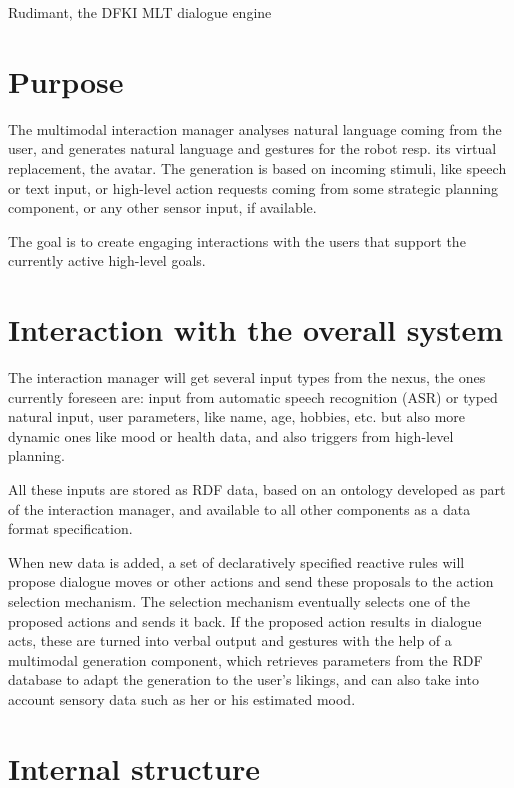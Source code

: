 \documentclass[a4paper]{article}
\begin{document}
\begin{center}
  \Large Rudimant, the DFKI MLT dialogue engine
\end{center}

\section{Purpose}

The multimodal interaction manager analyses natural language coming from the
user, and generates natural language and gestures for the robot resp. its
virtual replacement, the avatar. The generation is based on incoming stimuli,
like speech or text input, or high-level action requests coming from some
strategic planning component, or any other sensor input, if available.

The goal is to create engaging interactions with the users that support the
currently active high-level goals.

\section{Interaction with the overall system}

The interaction manager will get several input types from the nexus, the ones
currently foreseen are: input from automatic speech recognition (ASR) or typed
natural input, user parameters, like name, age, hobbies, etc. but also more
dynamic ones like mood or health data, and also triggers from high-level
planning.

All these inputs are stored as RDF data, based on an ontology developed as part
of the interaction manager, and available to all other components as a data
format specification.

When new data is added, a set of declaratively specified reactive rules will
propose dialogue moves or other actions and send these proposals to the action
selection mechanism. The selection mechanism eventually selects one of the
proposed actions and sends it back. If the proposed action results in dialogue
acts, these are turned into verbal output and gestures with the help of a
multimodal generation component, which retrieves parameters from the RDF
database to adapt the generation to the user's likings, and can also take into
account sensory data such as her or his estimated mood.

\section{Internal structure}
\end{document}

